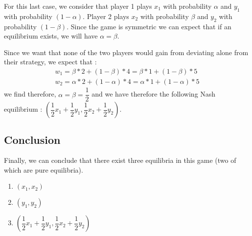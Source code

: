 For this last case, we consider that player 1 plays $x_1$ with probability $\alpha$ and $y_1$ with probability $(1-\alpha)$. Player 2 plays $x_2$ with probability $\beta$ and $y_2$ with probability $(1-\beta)$. Since the game is symmetric we can expect that if an equilibrium exists, we will have $\alpha = \beta$.

Since we want that none of the two players would gain from deviating alone from their strategy, we expect that :
\begin{align*}
w_1 = \beta * 2 + (1-\beta) * 4 = \beta * 1 + (1-\beta) * 5 \\
w_2 = \alpha * 2 + (1-\alpha) * 4 = \alpha * 1 + (1-\alpha) * 5
\end{align*}
we find therefore, $\alpha = \beta = \dfrac{1}{2}$ and we have therefore the following Nash equilibrium : $(\dfrac{1}{2}x_1+\dfrac{1}{2}y_1, \dfrac{1}{2}x_2+\dfrac{1}{2}y_2)$.

\subsection*{Conclusion}

Finally, we can conclude that there exist three equilibria in this game (two of which are pure equilibria).
\begin{enumerate}
	\item $(x_1, x_2)$
	\item $(y_1, y_2)$
	\item $(\dfrac{1}{2}x_1+\dfrac{1}{2}y_1, \dfrac{1}{2}x_2+\dfrac{1}{2}y_2)$
\end{enumerate}
